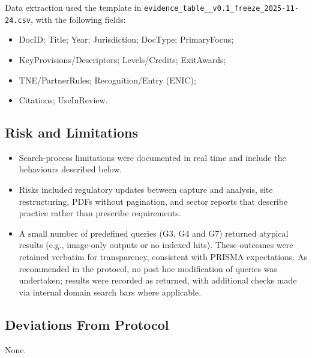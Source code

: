 Data extraction used the template in \texttt{evidence\_table\_\_v0.1\_freeze\_2025-11-24.csv}, with the following fields:

\begin{itemize}
    \item DocID; Title; Year; Jurisdiction; DocType; PrimaryFocus;
    \item KeyProvisions/Descriptors; Levels/Credits; ExitAwards;
    \item TNE/PartnerRules; Recognition/Entry (ENIC);
    \item Citations; UseInReview.
\end{itemize}

\subsection{Risk and Limitations}
\begin{itemize}
    \item Search-process limitations were documented in real time and include the behaviours described below.
    
    \item Risks included regulatory updates between capture and analysis, site restructuring, PDFs without pagination, and sector reports that describe practice rather than prescribe requirements.
    \item A small number of predefined queries (G3, G4 and G7) returned atypical results (e.g., image-only outputs or no indexed hits). These outcomes were retained verbatim for transparency, consistent with PRISMA expectations. As recommended in the protocol, no post hoc modification of queries was undertaken; results were recorded as returned, with additional checks made via internal domain search bars where applicable.

    
\end{itemize}


\subsection{Deviations From Protocol}

None.

